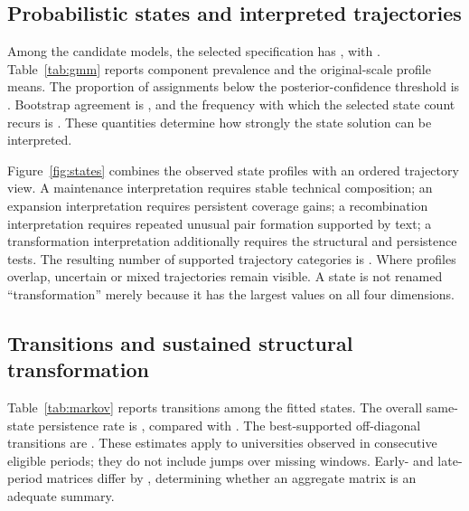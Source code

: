 \subsection{Probabilistic states and interpreted trajectories}
Among the candidate models, the selected specification has
, with
. Table~\ref{tab:gmm}
reports component prevalence and the original-scale profile means. The proportion
of assignments below the posterior-confidence threshold is
. Bootstrap agreement is
, and the frequency with which the selected state count
recurs is . These quantities determine how strongly
the state solution can be interpreted.

Figure~\ref{fig:states} combines the observed state profiles with an ordered
trajectory view. A maintenance interpretation requires stable technical
composition; an expansion interpretation requires persistent coverage gains;
a recombination interpretation requires repeated unusual pair formation supported
by text; a transformation interpretation additionally requires the structural and
persistence tests. The resulting number of supported trajectory categories is
. Where profiles overlap, uncertain or
mixed trajectories remain visible. A state is not renamed ``transformation'' merely
because it has the largest values on all four dimensions.





\subsection{Transitions and sustained structural transformation}
Table~\ref{tab:markov} reports transitions among the fitted states. The overall
same-state persistence rate is , compared with
. The best-supported off-diagonal
transitions are .
These estimates apply to universities observed in consecutive eligible periods;
they do not include jumps over missing windows. Early- and late-period matrices
differ by , determining
whether an aggregate matrix is an adequate summary.


